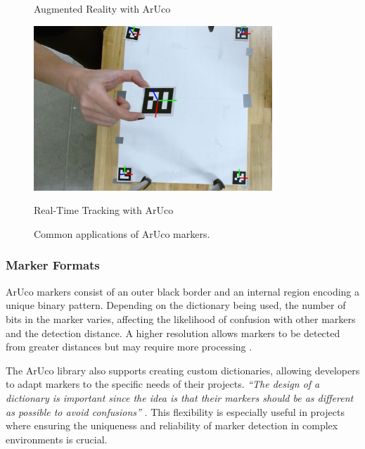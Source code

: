 \begin{figure}
\begin{minipage}{0.3\textwidth}
            \caption{Augmented Reality with ArUco}
            \label{fig:imagen2}
        \end{minipage}
        \hfill
        \begin{minipage}{0.3\textwidth}
            \centering
            \includegraphics[width=0.8\textwidth]{pictures/tracking_aruco.jpg}
            \caption{Real-Time Tracking with ArUco}
            \label{fig:imagen2}
        \end{minipage}
        \caption{Common applications of ArUco markers.}
    \end{figure}

    \subsubsection{Marker Formats}

    ArUco markers consist of an outer black border and an internal region encoding a unique binary pattern. Depending on the dictionary being used, the number of bits in the marker varies, affecting the likelihood of confusion with other markers and the detection distance. A higher resolution allows markers to be detected from greater distances but may require more processing \cite{aruco_docs}.

    The ArUco library also supports creating custom dictionaries, allowing developers to adapt markers to the specific needs of their projects. \textit{“The design of a dictionary is important since the idea is that their markers should be as different as possible to avoid confusions”} \cite{aruco_docs_pdf}. This flexibility is especially useful in projects where ensuring the uniqueness and reliability of marker detection in complex environments is crucial.


